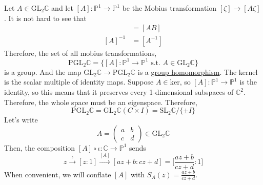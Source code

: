   Let $A \in \mathrm{GL}_2 \mathbb{C}$ and let $[A] : \mathbb{P}^1 \to \mathbb{P}^1$ be the Mobius transformation $[\zeta] \to [A \zeta]$. It is not hard to see that  
  \begin{align}
    [A] [B] & = [AB] \\ 
    [A]^{-1} & = [A^{-1}]
  \end{align}
  Therefore, the set of all mobius transformations, 
  \begin{equation}
    \mathrm{PGL}_2 \mathbb{C} = \{ [A] : \mathbb{P}^1 \to \mathbb{P}^1 \text{ s.t. } A \in \mathrm{GL}_2 \mathbb{C} \}
  \end{equation}
  is a group. And the map $\mathrm{GL}_2 \mathbb{C} \to \mathrm{PGL}_2 \mathbb{C}$ is a \hyperref[alg-def:group-homomorphism]{group homomorphism}. The kernel is the scalar multiple of identity maps. Suppose $A \in \mathrm{ker}$, so $[A] : \mathbb{P}^1 \to \mathbb{P}^1$ is the identity, so this means that it preserves every 1-dimensional subspaces of $\mathbb{C}^2$. Therefore, the whole space must be an eigenspace. Therefore, 
  \begin{equation}
    \mathrm{PGL}_2 \mathbb{C} = \mathrm{GL}_2 \mathbb{C}  (C \times I) = \mathrm{SL}_2 \mathbb{C} / \{\pm I\} 
  \end{equation}
  Let's write 
  \begin{equation}
    A = \begin{pmatrix} a & b \\ c & d \end{pmatrix} \in \mathrm{GL}_2 \mathbb{C}
  \end{equation} 
  Then, the composition $[A] \circ \iota : \mathbb{C} \to \mathbb{P}^1$ sends 
  \begin{equation}
    z \xrightarrow{\iota} [z : 1] \xrightarrow{[A]} [az + b : cz + d] = \bigg[ \frac{az + b}{cz + d} : 1 \bigg]
  \end{equation}
  When convenient, we will conflate $[A]$ with $S_A (z) = \frac{az + b}{cz + d}$. 

